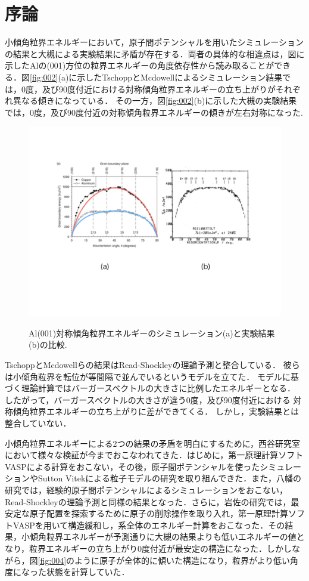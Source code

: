 
\section{序論}
小傾角粒界エネルギーにおいて，原子間ポテンシャルを用いたシミュレーションの結果と大槻による実験結果に矛盾が存在する．両者の具体的な相違点は，図に示したAlの(001)方位の粒界エネルギーの角度依存性から読み取ることができる．図\ref{fig:002}(a)に示したTschoppとMcdowellによるシミュレーション結果では，0度，及び90度付近における対称傾角粒界エネルギーの立ち上がりがそれぞれ異なる傾きになっている\cite{TschoppMcdowell}．
その一方，図\ref{fig:002}(b)に示した大槻の実験結果では，0度，及び90度付近の対称傾角粒界エネルギーの傾きが左右対称になった\cite{Otsuki}.

\begin{figure}[htbp]\begin{center}
\includegraphics[width=12cm,bb= 0 0 937 753]{../figs/./boundary_narita.002.jpeg}
\caption{Al(001)対称傾角粒界エネルギーのシミュレーション(a)と実験結果(b)の比較.}
\label{fig:002}
\label{default}\end{center}\end{figure}
TschoppとMcdowellらの結果はRead-Shockleyの理論予測と整合している．
彼らは小傾角粒界を転位が等間隔で並んでいるというモデルを立てた\cite{ReadShockley}．
モデルに基づく理論計算ではバーガースベクトルの大きさに比例したエネルギーとなる．
したがって，バーガースベクトルの大きさが違う0度，及び90度付近における
対称傾角粒界エネルギーの立ち上がりに差ができてくる．
しかし，実験結果とは整合していない．

小傾角粒界エネルギーによる2つの結果の矛盾を明白にするために，西谷研究室において様々な検証が今までおこなわれてきた．はじめに，第一原理計算ソフトVASPによる計算をおこない，その後，原子間ポテンシャルを使ったシミュレーションやSutton Vitekによる粒子モデルの研究を取り組んできた\cite{Murakami}．また，八幡の研究では，経験的原子間ポテンシャルによるシミュレーションをおこない，Read-Shockleyの理論予測と同様の結果となった\cite{Yahata}．さらに，岩佐の研究では，最安定な原子配置を探索するために原子の削除操作を取り入れ，第一原理計算ソフトVASPを用いて構造緩和し，系全体のエネルギー計算をおこなった\cite{Iwasa}．その結果，小傾角粒界エネルギーが予測通りに大槻の結果よりも低いエネルギーの値となり，粒界エネルギーの立ち上がり0度付近が最安定の構造になった．しかしながら，図\ref{fig:004}のように原子が全体的に傾いた構造になり，粒界がより低い角度になった状態を計算していた．

